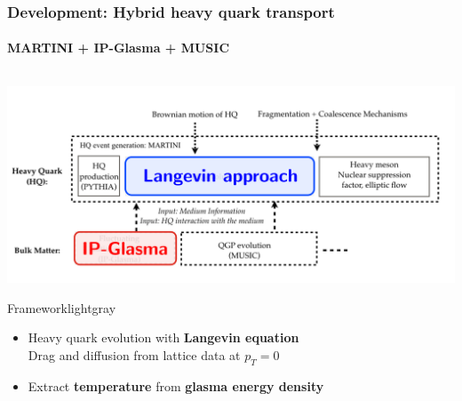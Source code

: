 \documentclass[aspectratio=169,11pt,usenames,dvipsnames]{beamer}
\begin{document}
\begin{frame}
    \frametitle{{\normalsize\color{jyured}\bfseries\sffamily Development: }Hybrid heavy quark transport}
    \framesubtitle{MARTINI + IP-Glasma + MUSIC}
    \vspace{-13pt}

    \begin{center}
        \begin{columns}
                \begin{center}\includegraphics[width=\columnwidth]{images/model_edit.png}
                    \vspace{-20pt}
                \begin{custombox2}{Framework}{lightgray}
                    \small
                    \begin{varwidth}{\textwidth}
                    \begin{itemize}\itemsep0em 
                        \item Heavy quark evolution with {\bfseries\color{blue}Langevin equation}\\
                            {\tiny Drag and diffusion from lattice data at $p_T=0$}
                        \item Extract {\bfseries\color{jyured}temperature} from {\bfseries\color{jyured}glasma energy density} 
                    \end{itemize}
                    \end{varwidth}
                \end{custombox2}
            \end{center}

\end{columns}
\end{center}
\end{frame}
\end{document}
